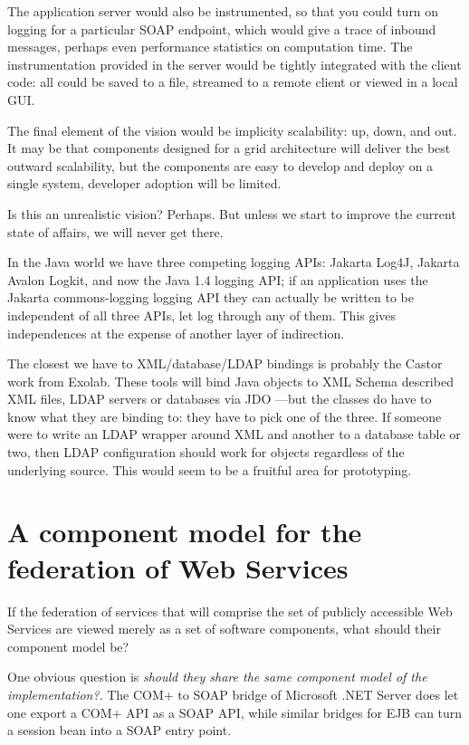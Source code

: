 \documentclass[draft]{report}
\begin{document}
The application server would also be instrumented, so that you could
turn on logging for a particular SOAP endpoint, which would give a trace
of inbound messages, perhaps even performance statistics on computation
time. The instrumentation provided in the server would be tightly
integrated with the client code: all could be saved to a file, streamed
to a remote client or viewed in a local GUI.

The final element of the vision would be implicity scalability: up,
down, and out. It may be that components designed for a grid
architecture will deliver the best outward scalability, but the
components are easy to develop and deploy on a single system, developer
adoption will be limited.

Is this an unrealistic vision? Perhaps. But unless we start to improve
the current state of affairs, we will never get there.

In the Java world we have three competing logging APIs: Jakarta Log4J,
Jakarta Avalon Logkit, and now the Java 1.4 logging API; if an
application uses the Jakarta commons-logging logging API they can
actually be written to be independent of all three APIs, let log through
any of them. This gives independences at the expense of another layer of
indirection.

The closest we have to XML/database/LDAP bindings is probably the Castor
work from Exolab. These tools will bind Java objects to XML Schema
described XML files, LDAP servers or databases via JDO ---but the classes
do have to know what they are binding to: they have to pick one of the
three. If someone were to write an LDAP wrapper around XML and another
to a database table or two, then LDAP configuration should work for
objects regardless of the underlying source. This would seem to be a
fruitful area for prototyping.

\chapter{A component model for the federation of Web Services}

If the federation of services that will comprise the set of publicly
accessible Web Services are viewed merely as a set of software
components, what should their component model be?

One obvious question is \emph{should they share the same component model
of the implementation?}. The COM+ to SOAP bridge of Microsoft .NET
Server does let one export a COM+ API as a SOAP API, while similar
bridges for EJB can turn a session bean into a SOAP entry point.
\end{document}
